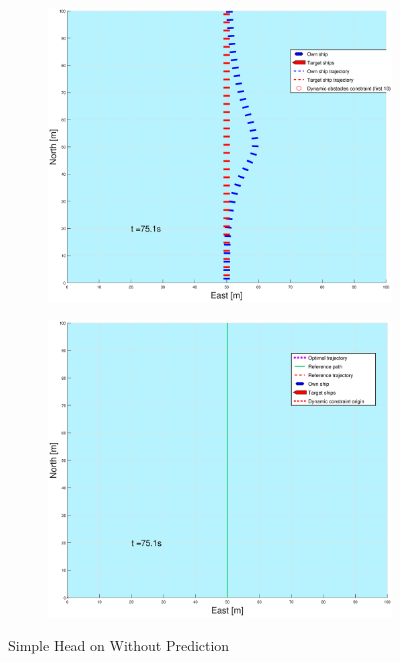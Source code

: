 \begin{figure}[ht]
\begin{subfigure}[b]{0.499\textwidth}
    \end{subfigure}
    \hfill
    \\
    \begin{subfigure}[b]{0.49\textwidth}
        \centering
        \includegraphics[width=\textwidth]{Images/Figures/enkel_HO/_Simple_1fig1_time=75}
    \end{subfigure}
    \hfill
    \begin{subfigure}[b]{0.499\textwidth}
        \centering
        \includegraphics[width=\textwidth]{Images/Figures/enkel_HO/_Simple_1fig999_time=75}
    \end{subfigure}
    \hfill
    \caption{Simple Head on Without Prediction}
\end{figure}

